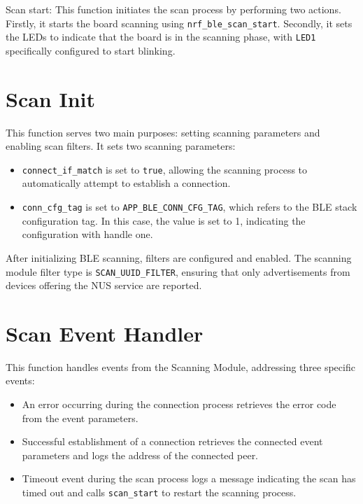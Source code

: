 \documentclass{Configuration_Files/PoliMi3i_thesis}
\begin{document}
Scan start: This function initiates the scan process by performing two actions. Firstly, it starts the board scanning using \texttt{nrf\_ble\_scan\_start}. Secondly, it sets the LEDs to indicate that the board is in the scanning phase, with \texttt{LED1} specifically configured to start blinking.

\section*{Scan Init}
This function serves two main purposes: setting scanning parameters and enabling scan filters. It sets two scanning parameters:
\begin{itemize}
    \item \texttt{connect\_if\_match} is set to \texttt{true}, allowing the scanning process to automatically attempt to establish a connection.
    \item \texttt{conn\_cfg\_tag} is set to \texttt{APP\_BLE\_CONN\_CFG\_TAG}, which refers to the BLE stack configuration tag. In this case, the value is set to 1, indicating the configuration with handle one.
\end{itemize}
After initializing BLE scanning, filters are configured and enabled. The scanning module filter type is \texttt{SCAN\_UUID\_FILTER}, ensuring that only advertisements from devices offering the NUS service are reported.

\section*{Scan Event Handler}
This function handles events from the Scanning Module, addressing three specific events:
\begin{itemize}
    \item An error occurring during the connection process retrieves the error code from the event parameters.
    \item Successful establishment of a connection retrieves the connected event parameters and logs the address of the connected peer.
    \item Timeout event during the scan process logs a message indicating the scan has timed out and calls \texttt{scan\_start} to restart the scanning process.
\end{itemize}
\end{document}
